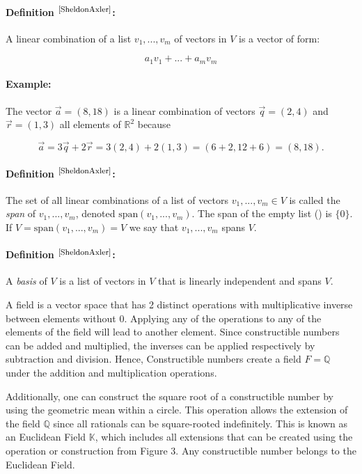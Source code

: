 \documentclass{article}
\begin{document}
\paragraph{Definition $^{\textrm{\footnotesize\cite{SheldonAxler}}}$:} A linear combination of a list $v_1,...,v_m$ of vectors in $V$ is a vector of form:

$$ a_1v_1 + ... +a_m v_m$$

\paragraph{Example:} The vector $\vec{a} = (8 , 18)$ is a linear combination of vectors $\vec{q} = (2, 4)$ and $\vec{r} = (1, 3)$ all elements of $\mathbb{R}^2$ because

$$\vec{a}= 3\vec{q} + 2\vec{r} = 3(2, 4) + 2(1, 3) = (6 + 2, 12 + 6) = (8, 18).$$

\paragraph{Definition $^{\textrm{\footnotesize\cite{SheldonAxler}}}$:} The set of all linear combinations of a list of vectors $v_1,...,v_m\in V$ is called the \textit{span} of $v_1,...,v_m$, denoted $\text{span}(v_1,...,v_m)$. The span of the empty list () is $\lbrace 0 \rbrace$. If $ V = \text{span}(v_1,...,v_m) = V$ we say that $v_1,...,v_m$ spans $V$.


\paragraph{Definition $^{\textrm{\footnotesize\cite{SheldonAxler}}}$:} A \textit{basis} of $V$ is a list of vectors in $V$ that is linearly independent and spans $V$.

\par
A field is a vector space that has 2  distinct operations with multiplicative inverse between elements without $0$. Applying any of the operations to any of the elements of the field will lead to another element. Since constructible numbers can be added and multiplied, the inverses can be applied respectively by subtraction and division. Hence, Constructible numbers create a field $F = \mathbb{Q}$ under the addition and multiplication operations. 

\par
Additionally, one can construct the square root of a constructible number by using the geometric mean within a circle. This operation allows the extension of the field $\mathbb{Q}$ since all rationals can be square-rooted indefinitely. This is known as an Euclidean Field $\mathbb{K}$, which includes all extensions that can be created using the operation or construction from Figure 3. Any constructible number belongs to the Euclidean Field.
\end{document}
